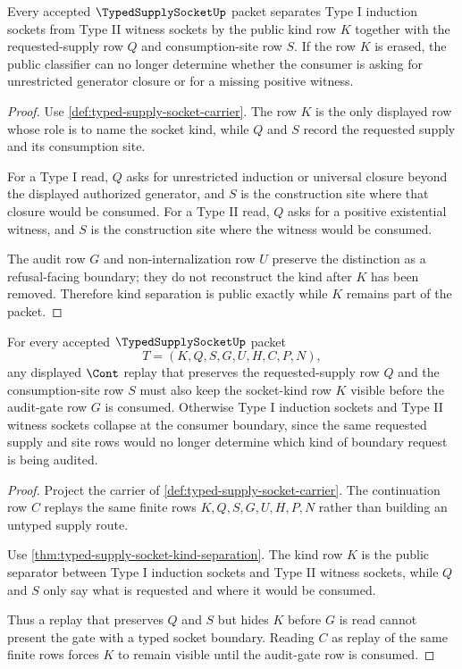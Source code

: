 \begin{theorem}
\label{thm:typed-supply-socket-kind-separation}
Every accepted $\TypedSupplySocketUp$ packet separates Type I induction sockets from Type II witness sockets by the public kind row $K$ together with the requested-supply row $Q$ and consumption-site row $S$. If the row $K$ is erased, the public classifier can no longer determine whether the consumer is asking for unrestricted generator closure or for a missing positive witness.
\end{theorem}
\begin{proof}
Use \autoref{def:typed-supply-socket-carrier}. The row $K$ is the only displayed row whose role is to name the socket kind, while $Q$ and $S$ record the requested supply and its consumption site.

For a Type I read, $Q$ asks for unrestricted induction or universal closure beyond the displayed authorized generator, and $S$ is the construction site where that closure would be consumed. For a Type II read, $Q$ asks for a positive existential witness, and $S$ is the construction site where the witness would be consumed.

The audit row $G$ and non-internalization row $U$ preserve the distinction as a refusal-facing boundary; they do not reconstruct the kind after $K$ has been removed. Therefore kind separation is public exactly while $K$ remains part of the packet.
\end{proof}

\begin{theorem}
\label{thm:typed-supply-socket-continuation-kind-transport}
For every accepted $\TypedSupplySocketUp$ packet
$$
T=(K,Q,S,G,U,H,C,P,N),
$$
any displayed $\Cont$ replay that preserves the requested-supply row $Q$ and the consumption-site row $S$ must also keep the socket-kind row $K$ visible before the audit-gate row $G$ is consumed. Otherwise Type I induction sockets and Type II witness sockets collapse at the consumer boundary, since the same requested supply and site rows would no longer determine which kind of boundary request is being audited.
\end{theorem}
\begin{proof}
Project the carrier of \autoref{def:typed-supply-socket-carrier}. The continuation row $C$ replays the same finite rows $K,Q,S,G,U,H,P,N$ rather than building an untyped supply route.

Use \autoref{thm:typed-supply-socket-kind-separation}. The kind row $K$ is the public separator between Type I induction sockets and Type II witness sockets, while $Q$ and $S$ only say what is requested and where it would be consumed.

Thus a replay that preserves $Q$ and $S$ but hides $K$ before $G$ is read cannot present the gate with a typed socket boundary. Reading $C$ as replay of the same finite rows forces $K$ to remain visible until the audit-gate row is consumed.
\end{proof}


